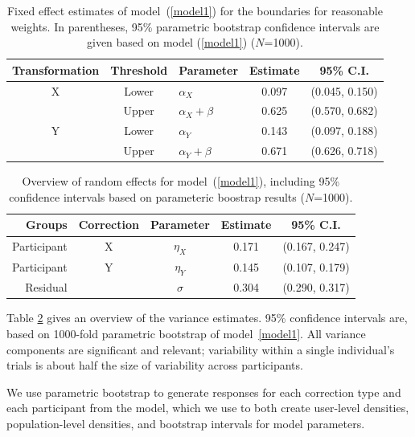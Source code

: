 \documentclass[11pt]{isuthesis}\usepackage[]{graphicx}\usepackage[]{color}
\begin{document}
\begin{table}[htbp]\centering
\caption[Sine illusion model: fixed effects]{Fixed effect estimates of model~(\ref{model1}) for the boundaries for reasonable weights. In parentheses,  95\% parametric bootstrap confidence intervals are given based on model (\ref{model1}) ($N$=1000).}\label{fixedeffectsresults}
\begin{tabular}{cclcc}
  \hline
Transformation & Threshold &  \multicolumn{1}{c}{Parameter} & Estimate & 95\% C.I. \\ 
  \hline
X & Lower & $\alpha_X$ & 0.097 & (0.045, 0.150) \\ 
   & Upper& $\alpha_X + \beta$  & 0.625 & (0.570, 0.682) \\ 
  Y & Lower& $\alpha_Y$  & 0.143 & (0.097, 0.188) \\ 
   & Upper& $\alpha_Y + \beta$  & 0.671 & (0.626, 0.718) \\ 
   \hline
\end{tabular}
\end{table}
\begin{table}[hbtp]\centering
\caption[Sine illusion model: random effects]{Overview of random effects for model~(\ref{model1}), including 95\% confidence intervals based on parameteric boostrap results ($N$=1000).}\label{randomeffectsresults}
\begin{tabular}{rcccc}
  \hline
Groups & Correction & Parameter & Estimate & 95\% C.I. \\ 
  \hline
  Participant & X &$\eta_X$  & 0.171 & (0.167, 0.247) \\ 
  Participant & Y &$\eta_Y$ &  0.145 & (0.107, 0.179) \\ 
  Residual &  &$\sigma$ &  0.304 & (0.290, 0.317) \\ 
   \hline
\end{tabular}
\end{table}

Table \ref{randomeffectsresults} gives an overview of the variance estimates. 95\% confidence intervals are, based on 1000-fold parametric bootstrap of model~\ref{model1}. All variance components are significant and relevant; variability within a single individual's trials is about half the size of variability across  participants. 

We use parametric bootstrap to generate responses for each correction type and each participant from the model, which we use to both  create user-level densities, population-level densities, and bootstrap intervals for model parameters. 
\end{document}
